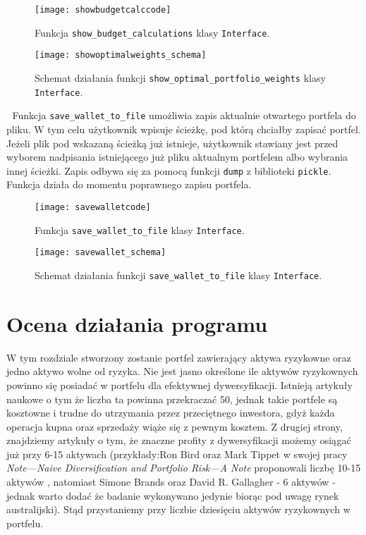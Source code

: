 \documentclass[magister]{dyplom}
\def\code#1{\texttt{#1}}
\begin{document}
\begin{figure}[ht!]
	\centering
	\texttt{[image: showbudgetcalccode]}
	\caption{Funkcja \code{show\_budget\_calculations} klasy \code{Interface}.}
\end{figure}
\newpage
\begin{figure}[ht!]
	\centering
	\texttt{[image: showoptimalweights\_schema]}
	\caption{Schemat działania funkcji \code{show\_optimal\_portfolio\_weights} klasy \code{Interface}.}
\end{figure}
\newpage
\textcolor{white}{.}
\newpage
Funkcja \code{save\_wallet\_to\_file} umożliwia zapis aktualnie otwartego portfela do pliku. W tym celu użytkownik wpisuje ścieżkę, pod którą chciałby zapisać portfel. Jeżeli plik pod wskazaną ścieżką już istnieje, użytkownik stawiany jest przed wyborem nadpisania istniejącego już pliku aktualnym portfelem albo wybrania innej ścieżki. Zapis odbywa się za pomocą funkcji \code{dump} z biblioteki \code{pickle}. Funkcja działa do momentu poprawnego zapisu portfela.

\begin{figure}[ht]
	\centering
	\texttt{[image: savewalletcode]}
	\caption{Funkcja \code{save\_wallet\_to\_file} klasy \code{Interface}.}
\end{figure}

\begin{figure}[ht]
	\centering
	\texttt{[image: savewallet\_schema]}
	\caption{Schemat działania funkcji \code{save\_wallet\_to\_file} klasy \code{Interface}.}
\end{figure}

\chapter{Ocena działania programu}

W tym rozdziale stworzony zostanie portfel zawierający aktywa ryzykowne oraz jedno aktywo wolne od ryzyka. Nie jest jasno określone ile aktywów ryzykownych powinno się posiadać w portfelu dla efektywnej dywersyfikacji. Istnieją artykuły naukowe o tym że liczba ta powinna przekraczać 50, jednak takie portfele są kosztowne i trudne do utrzymania przez przeciętnego inwestora, gdyż każda operacja kupna oraz sprzedaży wiąże się z pewnym kosztem. Z drugiej strony, znajdziemy artykuły o tym, że znaczne profity z dywersyfikacji możemy osiągać już przy 6-15 aktywach (przykłady:Ron Bird oraz Mark Tippet w swojej pracy \textit{Note---Naive Diversification and Portfolio Risk---A Note} proponowali liczbę 10-15 aktywów \cite{birdtippett}, natomiast Simone Brands oraz David R. Gallagher - 6 aktywów - jednak warto dodać że badanie wykonywano jedynie biorąc pod uwagę rynek australijski\cite{brandsgallagher})\cite{howmanystocks}. Stąd przystaniemy przy liczbie dziesięciu aktywów ryzykownych w portfelu.
\end{document}
